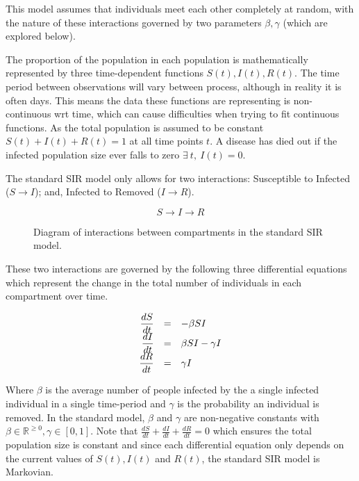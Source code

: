 \documentclass[11pt,a4paper]{article}
\theoremstyle{break}
\begin{document}
  \par This model assumes that individuals meet each other completely at random, with the nature of these interactions governed by two parameters $\beta,\gamma$ (which are explored below).

  \par The proportion of the population in each population is mathematically represented by three time-dependent functions $S(t),I(t),R(t)$. The time period between observations will vary between process, although in reality it is often days. This means the data these functions are representing is non-continuous wrt time, which can cause difficulties when trying to fit continuous functions. As the total population is assumed to be constant $S(t)+I(t)+R(t)=1$ at all time points $t$. A disease has died out if the infected population size ever falls to zero $\exists\ t,\ I(t)=0$.

  \par The standard SIR model only allows for two interactions: Susceptible to Infected ($S\to I$); and, Infected to Removed ($I\to R$).

  \[ S\to I\to R \] %

  \begin{figure}[H]
    \centering
    \caption{Diagram of interactions between compartments in the standard SIR model.}
    \label{fig_sir_model_diagram}
  \end{figure}

  \par These two interactions are governed by the following three differential equations which represent the change in the total number of individuals in each compartment over time.

  \[\everymath={\displaystyle}\begin{array}{rcl}
    \frac{dS}{dt}&=&-\beta SI\\
    \frac{dI}{dt}&=&\beta SI-\gamma I\\
    \frac{dR}{dt}&=&\gamma I
  \end{array}\]

  \par Where $\beta$ is the average number of people infected by the a single infected individual in a single time-period and $\gamma$ is the probability an individual is removed. In the standard model, $\beta$ and $\gamma$ are non-negative constants with $\beta\in\mathbb{R}^{\geq0},\gamma\in[0,1]$. Note that $\frac{dS}{dt}+\frac{dI}{dt}+\frac{dR}{dt}=0$ which ensures the total population size is constant and since each differential equation only depends on the current values of $S(t),I(t)$ and $R(t)$, the standard SIR model is Markovian.
\end{document}
